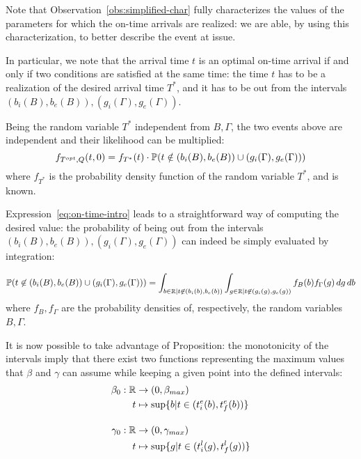 Note that Observation~\ref{obs:simplified-char} fully characterizes the values of the parameters for which the on-time arrivals are realized:
we are able, by using this characterization, to better describe the event at issue.

In particular, we note that the arrival time \(t\) is an optimal on-time arrival if and only if two conditions are satisfied at the same time:
the time \(t\) has to be a realization of the desired arrival time \(T^*\),
and it has to  be out from the intervals \((b_i(B), b_e(B)), (g_i(\Gamma), g_e(\Gamma))\).

Being the random variable \(T^*\) independent from \(B, \Gamma\),
the two events above are independent and their likelihood can be multiplied:
\begin{equation}
  \label{eq:on-time-intro}
  f_{T^{opt}, Q}(t, 0) = f_{T^*}(t) \cdot \mathbb{P}(t \notin (b_i(B), b_e(B)) \cup (g_i(\Gamma), g_e(\Gamma)))
\end{equation}
where \(f_{T^*}\) is the probability density function of the random variable \(T^*\), and is known.

Expression~\eqref{eq:on-time-intro} leads to a straightforward way of computing the desired value:
the probability of being out from the intervals \((b_i(B), b_e(B)), (g_i(\Gamma), g_e(\Gamma))\) can indeed be simply evaluated by integration:

\begin{equation}
  \label{eq:prob-not-intervals}
  \mathbb{P}( t \not\in (b_i(B), b_e(B)) \cup (g_i(\Gamma), g_e(\Gamma))) = \int_{b\in \mathbb{R} \vert t \not\in (b_i(b), b_e(b))}\int_{g \in \mathbb{R} \vert t \not\in (g_i(g), g_e(g))}f_B(b)f_\Gamma(g)\, dg\, db
\end{equation}
where \(f_B, f_\Gamma\) are the probability densities of, respectively, the random variables \(B, \Gamma\).


It is now possible to take advantage of Proposition:
the monotonicity of the intervals imply that there exist two functions representing the maximum values that \(\beta\) and \(\gamma\) can assume while keeping a given point into the defined intervals:
\begin{equation}
  \label{eq:def_b_0_g_0}
  \begin{split}
    \beta_0:\mathbb{R}&\rightarrow(0, \beta_{max}) \\
    t&\mapsto \sup\{b | t \in (t_i^e(b), t_f^e(b))\} \\[1em]
    \gamma_0:\mathbb{R}&\rightarrow(0, \gamma_{max}) \\
    t&\mapsto \sup\{g | t \in (t_i^l(g), t_f^l(g))\}
  \end{split}
\end{equation}

